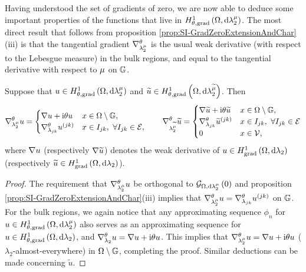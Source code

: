 Having understood the set of gradients of zero, we are now able to deduce some important properties of the functions that live in $H^1_{\theta, \mathrm{grad}}\left( \Omega, \mathrm{d}\lambda_2^{\mu} \right)$.
The most direct result that follows from proposition \ref{prop:SI-GradZeroExtensionAndChar}(iii) is that the tangential gradient $\nabla^{\theta}_{\lambda_2^{\mu}}$ is the usual weak derivative (with respect to the Lebesgue measure) in the bulk regions, and equal to the tangential derivative with respect to $\mu$ on $\mathbb{G}$.
\begin{cory}
	Suppose that $u\in H^1_{\theta, \mathrm{grad}}\left( \Omega, \mathrm{d}\lambda_2^{\mu} \right)$ and $\widetilde{u}\in H^1_{\theta, \mathrm{grad}}\left( \Omega, \mathrm{d}\lambda_2^{\widetilde{\mu}} \right)$.
	Then 
	\begin{align*}
		\nabla^{\theta}_{\lambda_2^{\mu}}u = \begin{cases} \nabla u + \mathrm{i}\theta u & x\in\Omega\setminus\mathbb{G}, \\ \nabla^{\theta}_{\lambda_{jk}}u^{(jk)} & x\in I_{jk}, \ \forall I_{jk}\in\mathcal{E}, \end{cases}
		\qquad
		\nabla^{\theta}_{\lambda_2^{\widetilde{\mu}}}\widetilde{u} = \begin{cases} \nabla\widetilde{u} + \mathrm{i}\theta\widetilde{u} & x\in\Omega\setminus\mathbb{G}, \\ \nabla^{\theta}_{\lambda_{jk}}\widetilde{u} ^{(jk)} & x\in I_{jk}, \ \forall I_{jk}\in\mathcal{E} \\ 0 & x\in\mathcal{V}, \end{cases}
	\end{align*}
	where $\nabla u$ (respectively $\nabla\widetilde{u}$) denotes the weak derivative of $u\in H^1_\mathrm{grad}\left( \Omega, \mathrm{d}\lambda_2 \right)$ (respectively $\widetilde{u}\in H^1_\mathrm{grad}\left( \Omega, \mathrm{d}\lambda_2 \right)$).
\end{cory}
\begin{proof}
	The requirement that $\nabla^{\theta}_{\lambda_2^{\mu}}u$ be orthogonal to $\mathcal{G}_{ \Omega, \mathrm{d}\lambda_2^{\mu}}\left( 0 \right)$ and proposition \ref{prop:SI-GradZeroExtensionAndChar}(iii) implies that $\nabla^{\theta}_{\lambda_2^{\mu}}u = \nabla^{\theta}_{\lambda_{jk}}u^{(jk)}$ on $\mathbb{G}$.
	For the bulk regions, we again notice that any approximating sequence $\phi_n$ for $u\in H^1_{\theta, \mathrm{grad}}\left( \Omega, \mathrm{d}\lambda_2^{\mu} \right)$ also serves as an approximating sequence for $u\in H^1_{\theta, \mathrm{grad}}\left( \Omega, \mathrm{d}\lambda_2 \right)$, and $\nabla^{\theta}_{\lambda_2}u = \nabla u + \mathrm{i}\theta u$.
	This implies that $\nabla^{\theta}_{\lambda_2^{\mu}}u = \nabla u + \mathrm{i}\theta u$ ($\lambda_2$-almost-everywhere) in $\Omega\setminus\mathbb{G}$, completing the proof.
	Similar deductions can be made concerning $\widetilde{u}$.
\end{proof}

